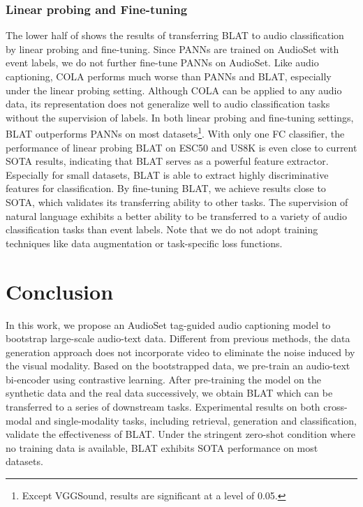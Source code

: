 \documentclass[sigconf]{acmart}
\begin{document}
\subsubsection{Linear probing and Fine-tuning}
The lower half of  shows the results of transferring BLAT to audio classification by linear probing and fine-tuning.
Since PANNs are trained on AudioSet with event labels, we do not further fine-tune PANNs on AudioSet.
Like audio captioning, COLA performs much worse than PANNs and BLAT, especially under the linear probing setting.
Although COLA can be applied to any audio data, its representation does not generalize well to audio classification tasks without the supervision of labels.
In both linear probing and fine-tuning settings, BLAT outperforms PANNs on most datasets\footnote{Except VGGSound, results are significant at a level of 0.05.}.
With only one FC classifier, the performance of linear probing BLAT on ESC50 and US8K is even close to current SOTA results, indicating that BLAT serves as a powerful feature extractor.
Especially for small datasets, BLAT is able to extract highly discriminative features for classification.
By fine-tuning BLAT, we achieve results close to SOTA, which validates its transferring ability to other tasks.
The supervision of natural language exhibits a better ability to be transferred to a variety of audio classification tasks than event labels.
Note that we do not adopt training techniques like data augmentation or task-specific loss functions.


\section{Conclusion}

In this work, we propose an AudioSet tag-guided audio captioning model to bootstrap large-scale audio-text data.
Different from previous methods, the data generation approach does not incorporate video to eliminate the noise induced by the visual modality. 
Based on the bootstrapped data, we pre-train an audio-text bi-encoder using contrastive learning.
After pre-training the model on the synthetic data and the real data successively, we obtain BLAT which can be transferred to a series of downstream tasks.
Experimental results on both cross-modal and single-modality tasks, including retrieval, generation and classification, validate the effectiveness of BLAT.
Under the stringent zero-shot condition where no training data is available, BLAT exhibits SOTA performance on most datasets.


\balance

\end{document}
